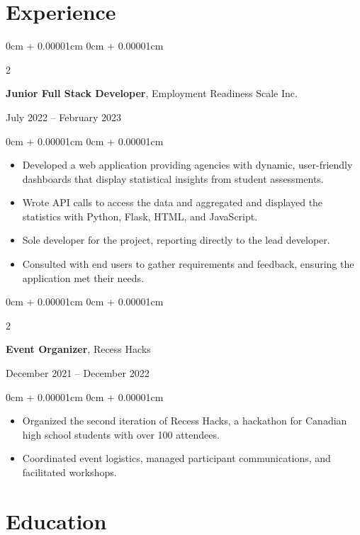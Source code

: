 \documentclass[10pt, letterpaper]{article}
\newenvironment{highlights}{
    \begin{itemize}[
        topsep=0.10cm,
        parsep=0.10cm,
        partopsep=0pt,
        itemsep=0pt,
        leftmargin=0cm + 10pt
    ]
}{
    \end{itemize}
}
\newenvironment{onecolentry}{
    \begin{adjustwidth}{
        0cm + 0.00001cm
    }{
        0cm + 0.00001cm
    }
}{
    \end{adjustwidth}
}
\newenvironment{twocolentry}[2][]{
    \onecolentry
    \def\secondColumn{#2}
    \setcolumnwidth{\fill, 5.5 cm} %
    \begin{paracol}{2}
}{
    \switchcolumn \raggedleft \secondColumn
    \end{paracol}
    \endonecolentry
}
\begin{document}
    \section{Experience}
    \begin{twocolentry}{July 2022 – February 2023}
        \textbf{Junior Full Stack Developer}, Employment Readiness Scale Inc.
    \end{twocolentry}
    \vspace{0.10cm}
    \begin{onecolentry}
        \begin{highlights}
            \item Developed a web application providing agencies with dynamic, user-friendly dashboards that display statistical insights from student assessments.
            \item Wrote API calls to access the data and aggregated and displayed the statistics with Python, Flask, HTML, and JavaScript. 
            \item Sole developer for the project, reporting directly to the lead developer.
            \item Consulted with end users to gather requirements and feedback, ensuring the application met their needs.
        \end{highlights}
    \end{onecolentry}

    \vspace{0.2cm}

    \begin{twocolentry}{December 2021 – December 2022}
        \textbf{Event Organizer}, Recess Hacks 
    \end{twocolentry}
    
    \vspace{0.10cm}
    \begin{onecolentry}
        \begin{highlights}
            \item Organized the second iteration of Recess Hacks, a hackathon for Canadian high school students with over 100 attendees.
            \item Coordinated event logistics, managed participant communications, and facilitated workshops.
        \end{highlights}
    \end{onecolentry}

    \section{Education}
    
\end{document}
